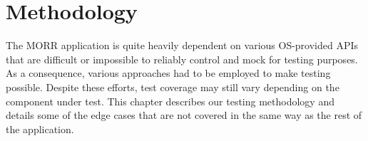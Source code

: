 \chapter{Methodology}

The MORR application is quite heavily dependent on various OS-provided APIs that are difficult or impossible to reliably control and mock for testing purposes. As a consequence, various approaches had to be employed to make testing possible. Despite these efforts, test coverage may still vary depending on the component under test. This chapter describes our testing methodology and details some of the edge cases that are not covered in the same way as the rest of the application.
